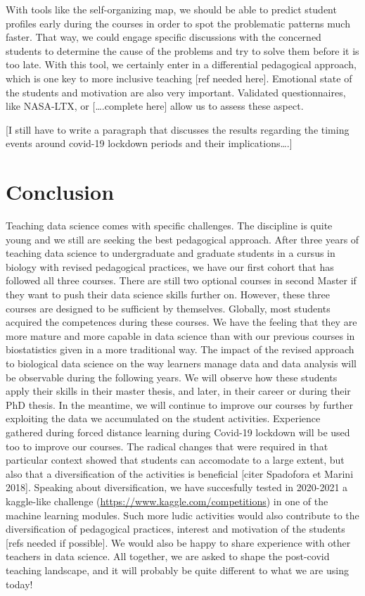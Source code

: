 \documentclass[
]{article}
\begin{document}
With tools like the self-organizing map, we should be able to predict
student profiles early during the courses in order to spot the
problematic patterns much faster. That way, we could engage specific
discussions with the concerned students to determine the cause of the
problems and try to solve them before it is too late. With this tool, we
certainly enter in a differential pedagogical approach, which is one key
to more inclusive teaching {[}ref needed here{]}. Emotional state of the
students and motivation are also very important. Validated
questionnaires, like NASA-LTX, or {[}\ldots.complete here{]} allow us to
assess these aspect.

{[}I still have to write a paragraph that discusses the results
regarding the timing events around covid-19 lockdown periods and their
implications\ldots.{]}

\hypertarget{conclusion}{%
\section{Conclusion}\label{conclusion}}

Teaching data science comes with specific challenges. The discipline is
quite young and we still are seeking the best pedagogical approach.
After three years of teaching data science to undergraduate and graduate
students in a cursus in biology with revised pedagogical practices, we
have our first cohort that has followed all three courses. There are
still two optional courses in second Master if they want to push their
data science skills further on. However, these three courses are
designed to be sufficient by themselves. Globally, most students
acquired the competences during these courses. We have the feeling that
they are more mature and more capable in data science than with our
previous courses in biostatistics given in a more traditional way. The
impact of the revised approach to biological data science on the way
learners manage data and data analysis will be observable during the
following years. We will observe how these students apply their skills
in their master thesis, and later, in their career or during their PhD
thesis. In the meantime, we will continue to improve our courses by
further exploiting the data we accumulated on the student activities.
Experience gathered during forced distance learning during Covid-19
lockdown will be used too to improve our courses. The radical changes
that were required in that particular context showed that students can
accomodate to a large extent, but also that a diversification of the
activities is beneficial {[}citer Spadofora et Marini 2018{]}. Speaking
about diversification, we have succesfully tested in 2020-2021 a
kaggle-like challenge (\url{https://www.kaggle.com/competitions}) in one
of the machine learning modules. Such more ludic activities would also
contribute to the diversification of pedagogical practices, interest and
motivation of the students {[}refs needed if possible{]}. We would also
be happy to share experience with other teachers in data science. All
together, we are asked to shape the post-covid teaching landscape, and
it will probably be quite different to what we are using today!
\end{document}
